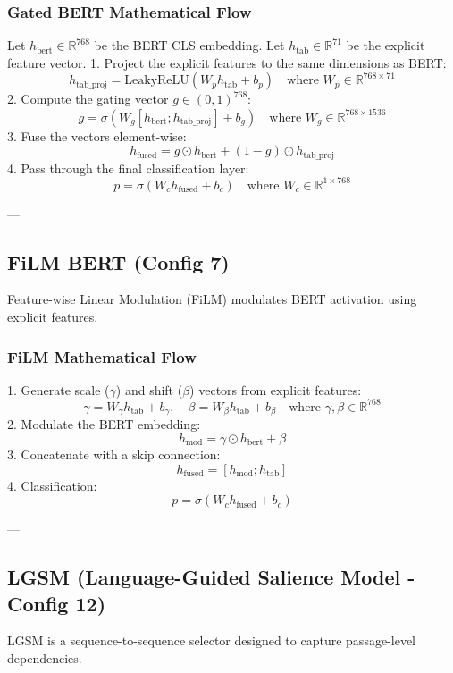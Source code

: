 \documentclass[11pt,a4paper]{article}
\begin{document}
\subsubsection{Gated BERT Mathematical Flow}
Let $h_{\text{bert}} \in \mathbb{R}^{768}$ be the BERT CLS embedding. Let $h_{\text{tab}} \in \mathbb{R}^{71}$ be the explicit feature vector.
1. Project the explicit features to the same dimensions as BERT:
\[
h_{\text{tab\_proj}} = \text{LeakyReLU}(W_p h_{\text{tab}} + b_p) \quad \text{where } W_p \in \mathbb{R}^{768 \times 71}
\]
2. Compute the gating vector $g \in (0, 1)^{768}$:
\[
g = \sigma(W_g [h_{\text{bert}}; h_{\text{tab\_proj}}] + b_g) \quad \text{where } W_g \in \mathbb{R}^{768 \times 1536}
\]
3. Fuse the vectors element-wise:
\[
h_{\text{fused}} = g \odot h_{\text{bert}} + (1 - g) \odot h_{\text{tab\_proj}}
\]
4. Pass through the final classification layer:
\[
p = \sigma(W_c h_{\text{fused}} + b_c) \quad \text{where } W_c \in \mathbb{R}^{1 \times 768}
\]

---

\subsection{FiLM BERT (Config 7)}
Feature-wise Linear Modulation (FiLM) modulates BERT activation using explicit features.

\subsubsection{FiLM Mathematical Flow}
1. Generate scale ($\gamma$) and shift ($\beta$) vectors from explicit features:
\[
\gamma = W_\gamma h_{\text{tab}} + b_\gamma, \quad \beta = W_\beta h_{\text{tab}} + b_\beta \quad \text{where } \gamma, \beta \in \mathbb{R}^{768}
\]
2. Modulate the BERT embedding:
\[
h_{\text{mod}} = \gamma \odot h_{\text{bert}} + \beta
\]
3. Concatenate with a skip connection:
\[
h_{\text{fused}} = [h_{\text{mod}}; h_{\text{tab}}]
\]
4. Classification:
\[
p = \sigma(W_c h_{\text{fused}} + b_c)
\]

---

\subsection{LGSM (Language-Guided Salience Model - Config 12)}
LGSM is a sequence-to-sequence selector designed to capture passage-level dependencies.
\end{document}
